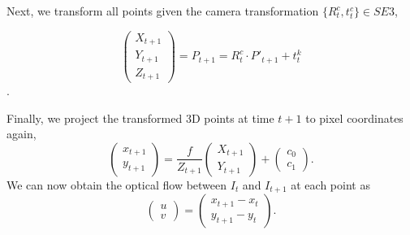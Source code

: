 Next, we transform all points given the camera transformation $\{R_t^c, t_t^c\} \in SE3$, %

\begin{equation}
\begin{pmatrix}
X_{t+1} \\ Y_{t+1} \\ Z_{t+1}
\end{pmatrix}
= P_{t+1} = R_t^c \cdot P'_{t+1} + t_t^k
\end{equation}.

Finally, we project the transformed 3D points at time $t+1$ to pixel coordinates again,
\begin{equation}
\begin{pmatrix}
x_{t+1} \\ y_{t+1}
\end{pmatrix}
=
\frac{f}{Z_{t+1}}
\begin{pmatrix}
X_{t+1} \\ Y_{t+1}
\end{pmatrix}
+
\begin{pmatrix}
c_0 \\ c_1
\end{pmatrix}.
\end{equation}
We can now obtain the optical flow between $I_t$ and $I_{t+1}$ at each point as
\begin{equation}
\begin{pmatrix}
u \\ v
\end{pmatrix}
=
\begin{pmatrix}
x_{t+1} - x_{t} \\ y_{t+1} - y_{t}
\end{pmatrix}.
\end{equation}


